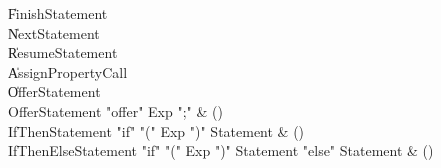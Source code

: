 \begin{bbgrammar}
    \| FinishStatement\\
    \| NextStatement\\
    \| ResumeStatement\\
    \| AssignPropertyCall\\
    \| OfferStatement\\
 OfferStatement  \label{prod:OfferStatement}  \: \xcd"offer" Exp \xcd";" & ()\\
 IfThenStatement  \label{prod:IfThenStatement}  \: \xcd"if" \xcd"(" Exp \xcd")" Statement & ()\\
 IfThenElseStatement  \label{prod:IfThenElseStatement}  \: \xcd"if" \xcd"(" Exp \xcd")" Statement  \xcd"else" Statement  & ()\\
\end{bbgrammar}

